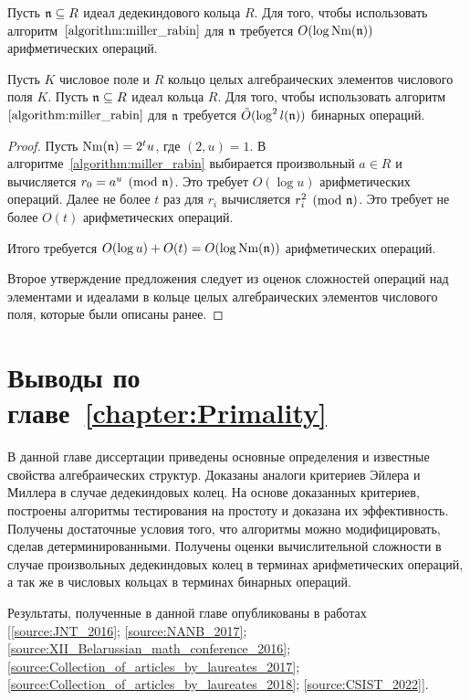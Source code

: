 \documentclass[_00_dissertation.tex]{subfiles}
\begin{document}
\begin{proposition}
    Пусть $\mathfrak{n} \subseteq R$ идеал дедекиндового кольца $R$.
    Для того, чтобы использовать алгоритм~$\ref{algorithm:miller_rabin}$ для $\mathfrak{n}$ требуется $O(\log \textrm{Nm}(\mathfrak{n}))$ арифметических операций.

    Пусть $K$ числовое поле и $R$ кольцо целых алгебраических элементов числового поля $K$.
    Пусть $\mathfrak{n} \subseteq R$ идеал кольца $R$.
    Для того, чтобы использовать алгоритм~$\ref{algorithm:miller_rabin}$ для $\mathfrak{n}$ требуется $\tilde{O}(\log^2 l(\mathfrak{n}))$ бинарных операций.
\end{proposition}
\begin{proof}
    Пусть $\textrm{Nm}(\mathfrak{n}) = 2^t u$, где $(2, u) = 1$.
    В алгоритме~\ref{algorithm:miller_rabin} выбирается произвольный $a \in R$ и вычисляется $r_0 = a^u \pmod{\mathfrak{n}}$.
    Это требует $O(\log u)$ арифметических операций.
    Далее не более $t$ раз для $r_i$ вычисляется $r_i^2 \pmod{\mathfrak{n}}$.
    Это требует не более $O(t)$ арифметических операций.

    Итого требуется $O(\log u) + O(t) = O(\log \textrm{Nm}(\mathfrak{n}))$ арифметических операций.

    Второе утверждение предложения следует из оценок сложностей операций над элементами и идеалами в кольце целых алгебраических элементов числового поля, которые были описаны ранее.
\end{proof}

\section*{Выводы по главе~\ref{chapter:Primality}}

В данной главе диссертации приведены основные определения и известные свойства алгебраических структур.
Доказаны аналоги критериев Эйлера и Миллера в случае дедекиндовых колец.
На основе доказанных критериев, построены алгоритмы тестирования на простоту и доказана их эффективность.
Получены достаточные условия того, что алгоритмы можно модифицировать, сделав детерминированными.
Получены оценки вычислительной сложности в случае произвольных дедекиндовых колец в терминах арифметических операций, а так же в числовых кольцах в терминах бинарных операций.

Результаты, полученные в данной главе опубликованы в работах [\ref{source:JNT_2016}; \ref{source:NANB_2017}; \ref{source:XII_Belarussian_math_conference_2016}; \ref{source:Collection_of_articles_by_laureates_2017}; \ref{source:Collection_of_articles_by_laureates_2018}; \ref{source:CSIST_2022}].

\onlyinsubfile{
    
}
\end{document}
